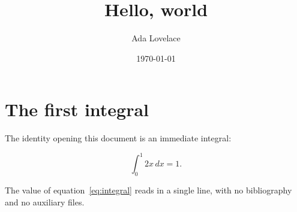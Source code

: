 \documentclass{article}
\title{Hello, world}
\author{Ada Lovelace}
\date{\today}
\begin{document}
\maketitle

\section{The first integral}\label{sec:integral}

The identity opening this document is an immediate integral:

\begin{equation}
  \int_0^1 2x \, dx = 1.
  \label{eq:integral}
\end{equation}

The value of equation~\ref{eq:integral} reads in a single line, with no
bibliography and no auxiliary files.
\end{document}
